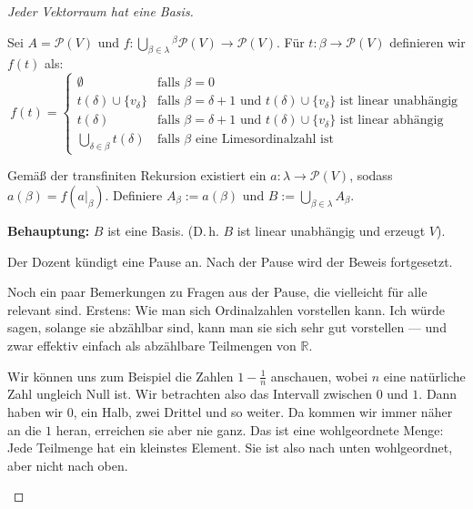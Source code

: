 \begin{proof}[Jeder Vektorraum hat eine Basis]
\begin{math-stroke}
\begin{short-proof}
Sei $A = \mathcal{P}(V)$ und $f: \bigcup_{\beta \in \lambda} {}^{\beta}\mathcal{P}(V) \to \mathcal{P}(V)$.
Für $t: \beta \to \mathcal{P}(V)$ definieren wir $f(t)$ als:
\[
f(t) = \begin{cases}
\emptyset & \text{falls } \beta = 0 \\
t(\delta) \cup \{v_\delta\} & \text{falls } \beta = \delta+1 \text{ und } t(\delta) \cup \{v_\delta\} \text{ ist linear unabhängig} \\
t(\delta) & \text{falls } \beta = \delta+1 \text{ und } t(\delta) \cup \{v_\delta\} \text{ ist linear abhängig} \\
\bigcup_{\delta \in \beta} t(\delta) & \text{falls } \beta \text{ eine Limesordinalzahl ist}
\end{cases}
\]

Gemäß der transfiniten Rekursion existiert ein $a: \lambda \to \mathcal{P}(V)$, sodass $a(\beta) = f(a|_\beta)$.
Definiere $A_\beta := a(\beta)$ und $B := \bigcup_{\beta \in \lambda} A_\beta$.

\textbf{Behauptung:} $B$ ist eine Basis.
(D.\,h. $B$ ist linear unabhängig und erzeugt $V$).
\end{short-proof}
\end{math-stroke}

\begin{lecture-break}[Pause]
Der Dozent kündigt eine Pause an. Nach der Pause wird der Beweis fortgesetzt.
\end{lecture-break}

\begin{spoken-clean}[00:45:25 - 00:47:00]
Noch ein paar Bemerkungen zu Fragen aus der Pause, die vielleicht für alle relevant sind. Erstens: Wie man sich Ordinalzahlen vorstellen kann. Ich würde sagen, solange sie abzählbar sind, kann man sie sich sehr gut vorstellen --- und zwar effektiv einfach als abzählbare Teilmengen von $\mathbb{R}$.

Wir können uns zum Beispiel die Zahlen $1 - \frac{1}{n}$ anschauen, wobei $n$ eine natürliche Zahl ungleich Null ist. Wir betrachten also das Intervall zwischen $0$ und $1$. Dann haben wir $0$, ein Halb, zwei Drittel und so weiter. Da kommen wir immer näher an die $1$ heran, erreichen sie aber nie ganz. Das ist eine wohlgeordnete Menge: Jede Teilmenge hat ein kleinstes Element. Sie ist also nach unten wohlgeordnet, aber nicht nach oben.


\end{spoken-clean}
\end{proof}
